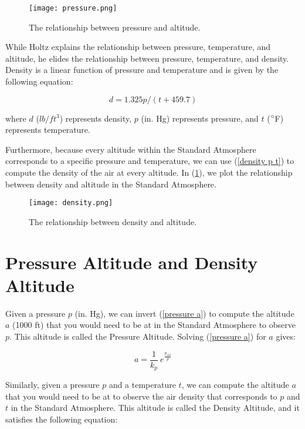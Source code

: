 \documentclass[10pt,a4paper]{article}
\begin{document}
\begin{figure}[h]
\texttt{[image: pressure.png]} 
\caption{The relationship between pressure and altitude.}
\end{figure}

While Holtz explains the relationship between pressure, temperature, and altitude, he elides the relationship between pressure, temperature, and density. Density is a linear function of pressure and temperature and is given by the following equation:

\begin{equation}
\label{density p t}
d = 1.325 p / (t + 459.7)
\end{equation}

where $d$ ($lb/ft^3$) represents density, $p$ (in. Hg) represents pressure, and $t$ ($\degree $F) represents temperature.

Furthermore, because every altitude within the Standard Atmosphere corresponds to a specific pressure and temperature, we can use (\ref{density p t}) to compute the density of the air at every altitude. In (\ref{plot density}), we plot the relationship between density and altitude in the Standard Atmosphere.

\begin{figure}[H]
\texttt{[image: density.png]}
\caption{The relationship between density and altitude.}
\label{plot density}
\end{figure}

\section{Pressure Altitude and Density Altitude}

Given a pressure $p$ (in. Hg), we can invert (\ref{pressure a}) to compute the altitude $a$ (1000 ft) that you would need to be at in the Standard Atmosphere to observe $p$. This altitude is called the Pressure Altitude. Solving (\ref{pressure a}) for $a$ gives:

\begin{equation}
\label{alt p}
a = \frac{1}{k_{p}}\ e^{\frac{p_{std}}{p}}
\end{equation}

Similarly, given a pressure $p$ and a temperature $t$, we can compute the altitude $a$ that you would need to be at to observe the air density that corresponds to $p$ and $t$ in the Standard Atmosphere. This altitude is called the Density Altitude, and it satisfies the following equation:
\end{document}
